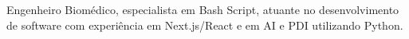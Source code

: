 Engenheiro Biomédico, especialista em Bash Script, atuante no desenvolvimento de software com experiência em Next.js/React e em AI e PDI utilizando Python.
